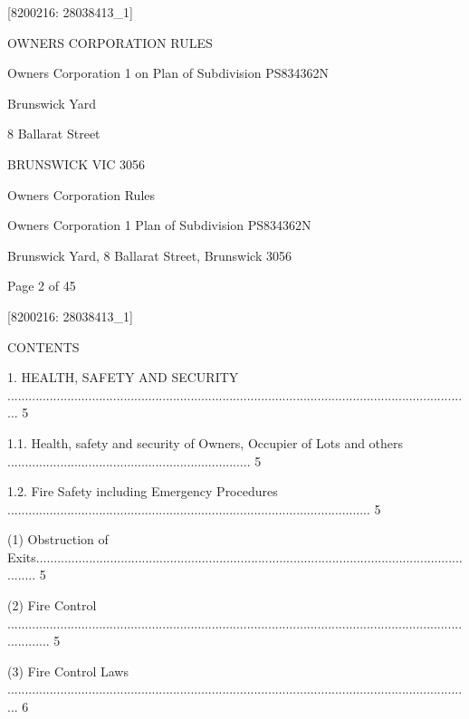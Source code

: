 \documentclass{article}
\begin{document}



{\fontsize{7.02}{1}[8200216: 28038413\_1] }

{\fontsize{13.98}{1}OWNERS CORPORATION RULES }

{\fontsize{10.98}{1}Owners Corporation 1 on Plan of Subdivision PS834362N }

{\fontsize{10.98}{1}Brunswick Yard }

{\fontsize{10.98}{1}8 Ballarat Street }

{\fontsize{10.98}{1}BRUNSWICK VIC 3056 }

\newpage





{\fontsize{9}{1}Owners Corporation Rules }

{\fontsize{9}{1}Owners Corporation 1 Plan of Subdivision PS834362N }

{\fontsize{9}{1}Brunswick Yard, 8 Ballarat Street, Brunswick 3056 }


{\fontsize{9}{1}Page 2  of 45 }



{\fontsize{7.02}{1}[8200216: 28038413\_1] }


{\fontsize{10.02}{1}CONTENTS }

{\fontsize{9.99}{1}1. HEALTH, SAFETY AND SECURITY .................................................................................................................................... 5 }

{\fontsize{9.99}{1}1.1. Health, safety and security of Owners, Occupier of Lots and others ..................................................................... 5 }

{\fontsize{9.99}{1}1.2. Fire Safety including Emergency Procedures ....................................................................................................... 5 }

{\fontsize{9.962}{1}(1) Obstruction of Exits................................................................................................................................. 5 }

{\fontsize{9.962}{1}(2) Fire Control ............................................................................................................................................. 5 }

{\fontsize{9.962}{1}(3) Fire Control Laws .................................................................................................................................... 6 }
\end{document}
